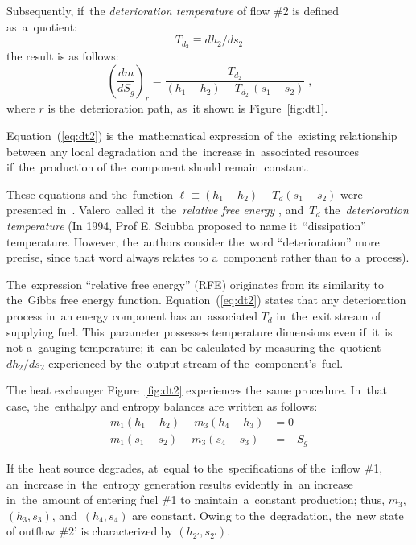 \documentclass[energies,article,accept,moreauthors,pdftex]{Definitions/mdpi}
\begin{document}
Subsequently, if~the \emph{deterioration temperature} of flow \#2 is defined as~a~quotient:
\[
T_{d_2}\equiv dh_2/ds_2
\]
the result is as follows:
\begin{equation}
\left(\frac{dm}{dS_g}\right)_r =\frac{T_{d_2}}{\left(h_1-h_2\right)-T_{d_2}\,\left(s_1-s_2\right)}\;\text{,}
\label{eq:dt2}
\end{equation}
where $r$ is the~deterioration path, as~it shown is Figure~\ref{fig:dt1}.

Equation~(\ref{eq:dt2}) is the~mathematical expression of the~existing relationship between any local degradation and the~increase in~associated resources if~the~production of the~component should remain~constant.

These equations and the~function $\ell\equiv (h_1-h_2) - T_d (s_1 - s_2)$ were presented in~\cite{Valero1992b}. Valero~called it~the~\emph{relative free energy} \cite{Royo1994,Royo1995}, and~$T_d$ the~\emph{deterioration temperature} (In 1994, Prof E. Sciubba proposed to name it~``dissipation'' temperature. However, the~authors consider the~word ``deterioration'' more precise, since that word always relates to a~component rather than to a~process).

The~expression ``relative free energy'' (RFE) originates from its similarity to the~Gibbs free energy function. Equation~(\ref{eq:dt2}) states that any deterioration process in~an energy component has an~associated $T_d$ in~the~exit stream  of supplying fuel. This~parameter possesses temperature dimensions even if~it~is not a~gauging temperature; it~can be calculated by measuring the~quotient $dh_2/ds_2$ experienced by the~output stream of the~component's~fuel.

The heat exchanger Figure~\ref{fig:dt2} experiences the~same procedure. In~that case, the~enthalpy and entropy balances are written as follows:
\begin{align}
m_1 \left(h_1 - h_2 \right) - m_3 \left(h_4 -h_3\right) &= 0 \\
m_1 \left(s_1 - s_2 \right) - m_3 \left(s_4 - s_3 \right) &= -S_g
\end{align}

If the~heat source degrades, at~equal to the~specifications of the~inflow \#1, an~increase in~the~entropy generation results evidently in~an increase in~the~amount of entering fuel \#1 to maintain~a~constant production; thus, $m_3$, $(h_3, s_3)$, and~$(h_4, s_4)$ are constant. Owing to the~degradation, the~new state of outflow \#2' is characterized by $(h_{2'}, s_{2'})$.
\end{document}
